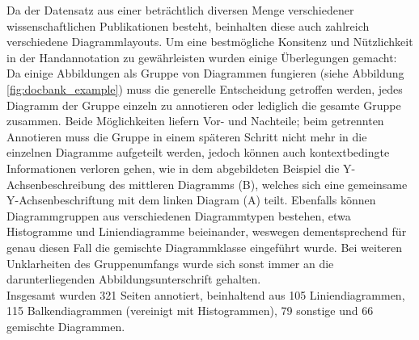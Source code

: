 Da der Datensatz aus einer beträchtlich diversen Menge verschiedener wissenschaftlichen Publikationen besteht, beinhalten diese auch zahlreich verschiedene Diagrammlayouts. Um eine bestmögliche Konsitenz und Nützlichkeit in der Handannotation zu gewährleisten wurden einige Überlegungen gemacht: Da einige Abbildungen als Gruppe von Diagrammen fungieren (siehe Abbildung \ref{fig:docbank_example}) muss die generelle Entscheidung getroffen werden, jedes Diagramm der Gruppe einzeln zu annotieren oder lediglich die gesamte Gruppe zusammen. Beide Möglichkeiten liefern Vor- und Nachteile; beim getrennten Annotieren muss die Gruppe in einem späteren Schritt nicht mehr in die einzelnen Diagramme aufgeteilt werden, jedoch können auch kontextbedingte Informationen verloren gehen, wie in dem abgebildeten Beispiel die Y-Achsenbeschreibung des mittleren Diagramms (B), welches sich eine gemeinsame Y-Achsenbeschriftung mit dem linken Diagram (A) teilt.
Ebenfalls können Diagrammgruppen aus verschiedenen Diagrammtypen bestehen, etwa Histogramme und Liniendiagramme beieinander, weswegen dementsprechend für genau diesen Fall die gemischte Diagrammklasse eingeführt wurde. Bei weiteren Unklarheiten des Gruppenumfangs wurde sich sonst immer an die darunterliegenden Abbildungsunterschrift gehalten.
\\
Insgesamt wurden 321 Seiten annotiert, beinhaltend aus 105 Liniendiagrammen, 115 Balkendiagrammen (vereinigt mit Histogrammen), 79 sonstige und 66 gemischte Diagrammen.


